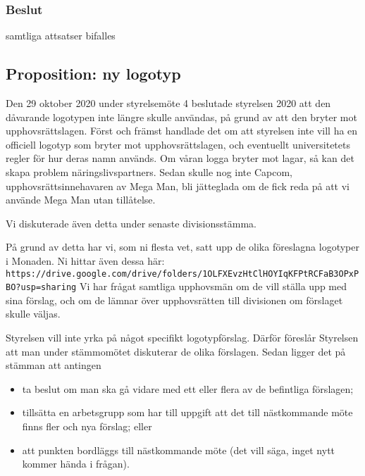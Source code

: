 \documentclass[protokoll]{dvd}
\begin{document}
\subsubsection*{Beslut}
    \begin{attsatser}
        \item samtliga attsatser bifalles
    \end{attsatser}

\newpage

\subsection{Proposition: ny logotyp}

Den 29 oktober 2020 under styrelsemöte 4 beslutade styrelsen 2020 att den dåvarande logotypen inte längre skulle användas, på grund av att den bryter mot upphovsrättslagen.
Först och främst handlade det om att styrelsen inte vill ha en officiell logotyp som bryter mot upphovsrättslagen, och eventuellt universitetets regler för hur deras namn används.
Om våran logga bryter mot lagar, så kan det skapa problem näringslivspartners.
Sedan skulle nog inte Capcom, upphovsrättsinnehavaren av Mega Man, bli jätteglada om de fick reda på att vi använde Mega Man utan tillåtelse.

Vi diskuterade även detta under senaste divisionsstämma.

På grund av detta har vi, som ni flesta vet, satt upp de olika föreslagna logotyper i Monaden.
Ni hittar även dessa här: \verb|https://drive.google.com/drive/folders/1OLFXEvzHtClHOYIqKFPtRCFaB3OPxPBO?usp=sharing|
Vi har frågat samtliga upphovsmän om de vill ställa upp med sina förslag, och om de lämnar över upphovsrätten till divisionen om förslaget skulle väljas.

Styrelsen vill inte yrka på något specifikt logotypförslag.
Därför föreslår Styrelsen att man under stämmomötet diskuterar de olika förslagen.
Sedan ligger det på stämman att antingen

\begin{itemize}
    \item ta beslut om man ska gå vidare med ett eller flera av de befintliga förslagen;
    \item tillsätta en arbetsgrupp som har till uppgift att det till nästkommande möte finns fler och nya förslag; eller
    \item att punkten bordläggs till nästkommande möte (det vill säga, inget nytt kommer hända i frågan).
\end{itemize}
\end{document}
